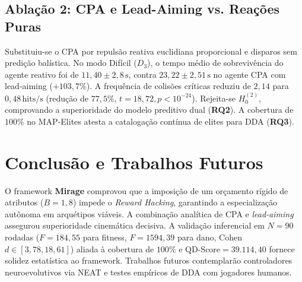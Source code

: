 \documentclass[10pt,conference,twocolumn]{article}
\begin{document}
\subsection{Ablação 2: CPA e Lead-Aiming vs. Reações Puras}
Substituiu-se o CPA por repulsão reativa euclidiana proporcional e disparos sem predição balística. No modo Difícil ($D_3$), o tempo médio de sobrevivência do agente reativo foi de $11{,}40 \pm 2{,}8\,\text{s}$, contra $23{,}22 \pm 2{,}51\,\text{s}$ no agente CPA com lead-aiming ($+103{,}7\%$). A frequência de colisões críticas reduziu de $2{,}14$ para $0{,}48\,\text{hits/s}$ (redução de $77{,}5\%$, $t = 18{,}72, p < 10^{-24}$). Rejeita-se $H_0^{(2)}$, comprovando a superioridade do modelo preditivo dual (\textbf{RQ2}). A cobertura de $100\%$ no MAP-Elites atesta a catalogação contínua de elites para DDA (\textbf{RQ3}).

\section{Conclusão e Trabalhos Futuros}
\label{sec:conclusao}
O framework \textbf{Mirage} comprovou que a imposição de um orçamento rígido de atributos ($B = 1{,}8$) impede o \textit{Reward Hacking}, garantindo a especialização autônoma em arquétipos viáveis. A combinação analítica de CPA e \textit{lead-aiming} assegurou superioridade cinemática decisiva. A validação inferencial em $N = 90$ rodadas ($F = 184{,}55$ para fitness, $F = 1594{,}39$ para dano, Cohen $d \in [3{,}78, 18{,}61]$) aliada à cobertura de $100\%$ e $\text{QD-Score} = 39.114{,}40$ fornece solidez estatística ao framework. Trabalhos futuros contemplarão controladores neuroevolutivos via NEAT \cite{stanley2002evolving} e testes empíricos de DDA com jogadores humanos.

\clearpage



\end{document}
